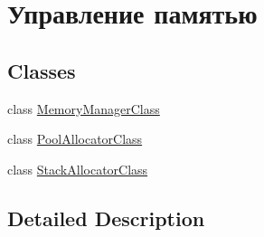 \hypertarget{group___memory_managment}{}\section{Управление памятью}
\label{group___memory_managment}
\subsection*{Classes}
\begin{DoxyCompactItemize}
\item 
class \hyperlink{class_memory_manager_class}{Memory\+Manager\+Class}
\item 
class \hyperlink{class_pool_allocator_class}{Pool\+Allocator\+Class}
\item 
class \hyperlink{class_stack_allocator_class}{Stack\+Allocator\+Class}
\end{DoxyCompactItemize}


\subsection{Detailed Description}
